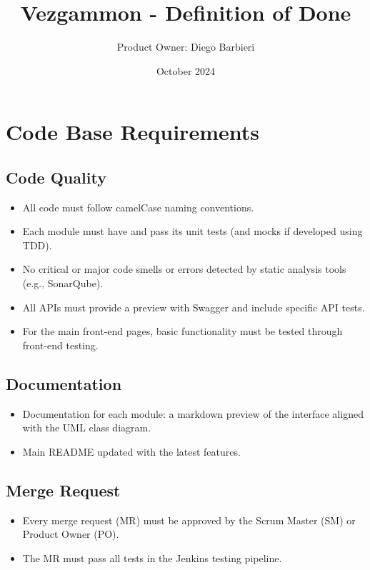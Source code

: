 \documentclass{article}
\title{Vezgammon - Definition of Done}
\author{Product Owner: Diego Barbieri}
\date{October 2024}
\begin{document}
\maketitle

\section{Code Base Requirements}

\subsection{Code Quality}
\begin{itemize}
    \item All code must follow camelCase naming conventions.
    \item Each module must have and pass its unit tests (and mocks if developed using TDD).
    \item No critical or major code smells or errors detected by static analysis tools (e.g., SonarQube).
    \item All APIs must provide a preview with Swagger and include specific API tests.
    \item For the main front-end pages, basic functionality must be tested through front-end testing.
\end{itemize}

\subsection{Documentation}
\begin{itemize}
    \item Documentation for each module: a markdown preview of the interface aligned with the UML class diagram.
    \item Main README updated with the latest features.
\end{itemize}

\subsection{Merge Request}
\begin{itemize}
    \item Every merge request (MR) must be approved by the Scrum Master (SM) or Product Owner (PO).
    \item The MR must pass all tests in the Jenkins testing pipeline.
\end{itemize}
\end{document}
